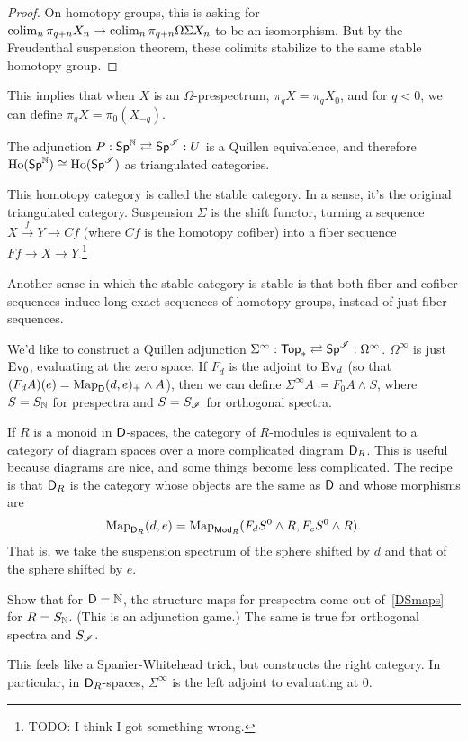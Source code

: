 \begin{proof}
On homotopy groups, this is asking for $\operatorname*{colim}_n\pi_{q+n} X_n\to\operatorname*{colim}_n\pi_{q+n}\Omega\Sigma X_n$ to be an
isomorphism. But by the Freudenthal suspension theorem, these colimits stabilize to the same stable homotopy group.
\end{proof}
This implies that when $X$ is an $\Omega$-prespectrum, $\pi_q X = \pi_q X_0$, and for $q < 0$, we can define $\pi_q
X =\pi_0(X_{-q})$.
\begin{thm}
The adjunction $P: \mathsf{Sp}^\mathbb N\rightleftarrows \mathsf{Sp}^\mathscr I: U$ is a Quillen equivalence, and therefore
$\operatorname{Ho}(\mathsf{Sp}^\mathbb N)\cong\operatorname{Ho}(\mathsf{Sp}^\mathscr I)$ as triangulated categories.
\end{thm}
This homotopy category is called the stable category. In a sense, it's the original triangulated category.
Suspension $\Sigma$ is the shift functor, turning a sequence $X\stackrel f\to Y\to Cf$ (where $Cf$ is the homotopy
cofiber) into a fiber sequence $Ff\to X\to Y$.\footnote{{\color{red}TODO}: I think I got something wrong.}

Another sense in which the stable category is stable is that both fiber and cofiber sequences induce long exact
sequences of homotopy groups, instead of just fiber sequences.

We'd like to construct a Quillen adjunction $\Sigma^\infty:\mathsf{Top}_*\rightleftarrows\mathsf{Sp}^\mathscr I: \Omega^\infty$.
$\Omega^\infty$ is just $\operatorname{Ev}_0$, evaluating at the zero space. If $F_d$ is the adjoint to $\operatorname{Ev}_d$ (so that
$(F_dA)(e) = \operatorname{Map}_\mathsf D(d, e)_+\wedge A$), then we can define $\Sigma^\infty A\coloneqq F_0A\wedge S$, where $S =
S_\mathbb N$ for prespectra and $S = S_\mathscr I$ for orthogonal spectra.

If $R$ is a monoid in $\mathsf D$-spaces, the category of $R$-modules is equivalent to a category of diagram spaces over
a more complicated diagram $\mathsf D_R$. This is useful because diagrams are nice, and some things become less
complicated. The recipe is that $\mathsf D_R$ is the category whose objects are the same as $\mathsf D$ and whose morphisms are
\begin{equation}
\label{DSmaps}
\operatorname{Map}_{\mathsf D_R}(d,e) = \operatorname{Map}_{\mathsf{Mod}_R}(F_d S^0\wedge R, F_eS^0\wedge R).
\end{equation}
That is, we take the suspension spectrum of the sphere shifted by $d$ and that of the sphere shifted by $e$.
\begin{ex}
Show that for $\mathsf D = \mathbb N$, the structure maps for prespectra come out of~\eqref{DSmaps} for $R = S_\mathbb N$.  (This is an
adjunction game.) The same is true for orthogonal spectra and $S_\mathscr I$.
\end{ex}
This feels like a Spanier-Whitehead trick, but constructs the right category. In particular, in $\mathsf D_R$-spaces,
$\Sigma^\infty$ is the left adjoint to evaluating at $0$.

